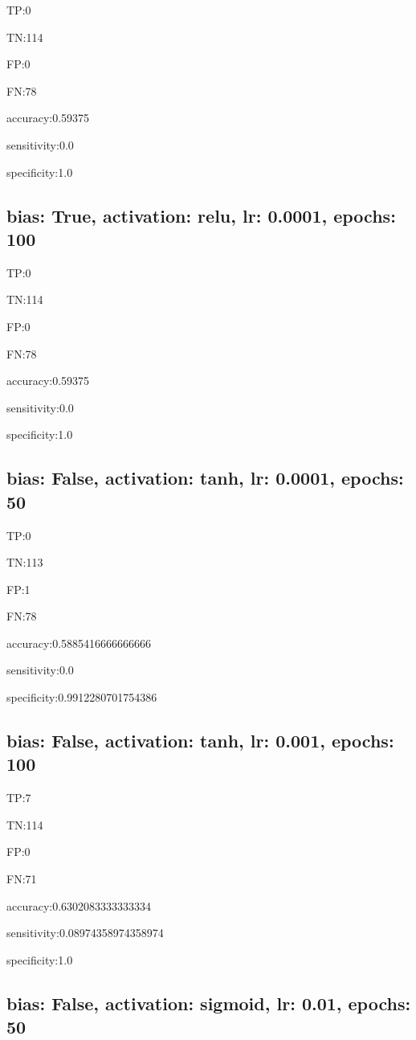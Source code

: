 \documentclass{article}
\begin{document}
TP:0

TN:114

FP:0

FN:78

accuracy:0.59375

sensitivity:0.0

specificity:1.0



\subsection{bias: True, activation: relu, lr: 0.0001, epochs: 100}

TP:0

TN:114

FP:0

FN:78

accuracy:0.59375

sensitivity:0.0

specificity:1.0



\subsection{bias: False, activation: tanh, lr: 0.0001, epochs: 50}

TP:0

TN:113

FP:1

FN:78

accuracy:0.5885416666666666

sensitivity:0.0

specificity:0.9912280701754386



\subsection{bias: False, activation: tanh, lr: 0.001, epochs: 100}

TP:7

TN:114

FP:0

FN:71

accuracy:0.6302083333333334

sensitivity:0.08974358974358974

specificity:1.0



\subsection{bias: False, activation: sigmoid, lr: 0.01, epochs: 50}
\end{document}
